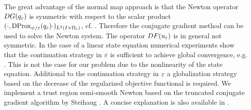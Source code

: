 The great advantage of the normal map approach is that the Newton operator $DG(q_{\varepsilon})$ is symmetric with respect to the scalar product $(\cdot,\operatorname{DProx}_{\psi/ \varepsilon}(q_{\varepsilon})\cdot)_{L^2(I\times\Omega_c)}$, cf. \cite{PieperRund2015,pieperthesis}. Therefore the conjugate gradient method can be used to solve the Newton system. The operator $DF(u_\varepsilon)$ is in general not symmetric. In the case of a linear state equation numerical experiments show that the continuation strategy in $\varepsilon$ is sufficient to achieve global convergence, e.g. \cite{ClasonKunisch:2011b}. This is not the case for our problem due to the nonlinearity of the state equation. Additional to the continuation strategy in $\varepsilon$ a globalization strategy based on the decrease of the regularized objective functional is required. We implement a trust region semi-smooth Newton based on the truncated conjugate gradient algorithm by Steihaug \cite{pieperthesis,steihaug1983}.  {\color{red}A concise explanation is also available in \cite[Section 6.2 and A.3]{PieperRund2015}}.

